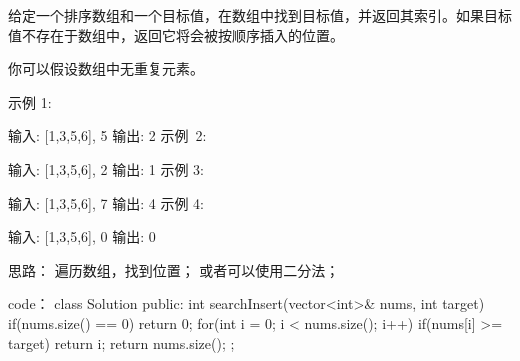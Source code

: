 给定一个排序数组和一个目标值，在数组中找到目标值，并返回其索引。如果目标值不存在于数组中，返回它将会被按顺序插入的位置。

你可以假设数组中无重复元素。

示例 1:

输入: [1,3,5,6], 5
输出: 2
示例 2:

输入: [1,3,5,6], 2
输出: 1
示例 3:

输入: [1,3,5,6], 7
输出: 4
示例 4:

输入: [1,3,5,6], 0
输出: 0



























思路：
遍历数组，找到位置；
或者可以使用二分法；



























code：
class Solution {
public:
    int searchInsert(vector<int>& nums, int target) {
        if(nums.size() == 0) return 0;
        for(int i = 0; i < nums.size(); i++)
        {
            if(nums[i] >= target)
                return i;
        }
        return nums.size();
    }
};